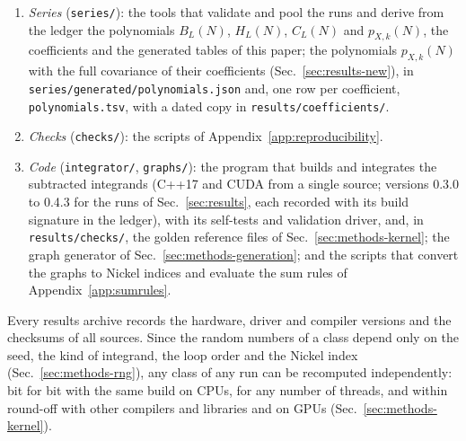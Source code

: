\begin{enumerate}
complete records of the campaigns of Sec.~\ref{sec:results} (reports, logs and environment records) are kept outside
the repository; the run files of the ledger's contributions are deposited with its archive.
\item \emph{Series} (\texttt{series/}): the tools that validate and pool the runs and derive from the ledger the
polynomials $B_L(N)$, $H_L(N)$, $C_L(N)$ and $p_{X,k}(N)$, the coefficients and the generated tables of this paper; the
polynomials $p_{X,k}(N)$ with the full covariance of their coefficients (Sec.~\ref{sec:results-new}), in
\texttt{series/generated/polynomials.json} and, one row per coefficient, \texttt{polynomials.tsv}, with a dated copy
in \texttt{results/coefficients/}.
\item \emph{Checks} (\texttt{checks/}): the scripts of Appendix~\ref{app:reproducibility}.
\item \emph{Code} (\texttt{integrator/}, \texttt{graphs/}): the program that builds and integrates the subtracted integrands (C++17 and CUDA from a single
source; versions 0.3.0 to 0.4.3 for the runs of Sec.~\ref{sec:results}, each recorded with its build signature in
the ledger), with
its self-tests and validation driver, and, in \texttt{results/checks/}, the golden reference files of
Sec.~\ref{sec:methods-kernel}; the graph generator of
Sec.~\ref{sec:methods-generation}; and the scripts that convert the graphs to Nickel indices and evaluate the sum
rules of Appendix~\ref{app:sumrules}.
\end{enumerate}
Every results archive records the hardware, driver and compiler versions and the checksums of all sources. Since the
random numbers of a class depend only on the seed, the kind of integrand, the loop order and the Nickel index
(Sec.~\ref{sec:methods-rng}), any class of any run can be recomputed independently: bit for bit with the same build
on CPUs, for any number of threads, and within round-off with other compilers and libraries and on GPUs
(Sec.~\ref{sec:methods-kernel}).
